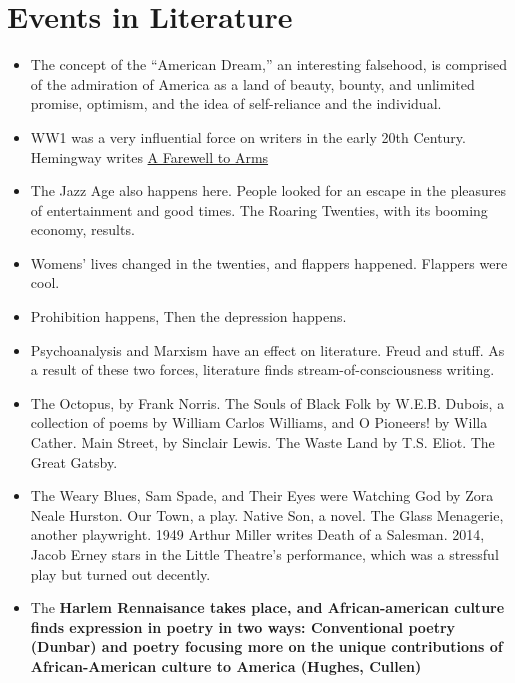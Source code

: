 \documentclass[10pt]{article}
\begin{document}
\section{Events in Literature}
\begin{itemize}
	\item The concept of the ``American Dream,'' an interesting falsehood, 
		is comprised of the admiration of America as a land of beauty, 
		bounty, and unlimited promise, optimism, and the idea of 
		self-reliance and the individual.
	\item WW1 was a very influential force on writers in the early 20th 
		Century.  Hemingway writes \underline{A Farewell to Arms}
	\item The Jazz Age also happens here.  People looked for an escape in 
		the pleasures of entertainment and good times.  The Roaring 
		Twenties, with its booming economy, results.
	\item Womens' lives changed in the twenties, and flappers happened.  
		Flappers were cool.
	\item Prohibition happens, Then the depression happens.
	\item Psychoanalysis and Marxism have an effect on literature.  Freud 
		and stuff.  As a result of these two forces, literature finds 
		stream-of-consciousness writing.
	\item The Octopus, by Frank Norris.  The Souls of Black Folk by W.E.B. 
		Dubois, a collection of poems by William Carlos Williams, and 
		O Pioneers! by Willa Cather.  Main Street, by Sinclair Lewis.  
		The Waste Land by T.S. Eliot.  The Great Gatsby.
	\item The Weary Blues, Sam Spade, and Their Eyes were Watching God by 
		Zora Neale Hurston.  Our Town, a play.  Native Son, a novel.  
		The Glass Menagerie, another playwright.  1949 Arthur Miller 
		writes Death of a Salesman.  2014, Jacob Erney stars in the 
		Little Theatre's performance, which was a stressful play but 
		turned out decently.
	\item The \bf{Harlem Rennaisance} takes place, and African-american 
		culture finds expression in poetry in two ways: Conventional 
		poetry (Dunbar) and poetry focusing more on the unique 
		contributions of African-American culture to America (Hughes, 
		Cullen)
\end{itemize}
\end{document}
